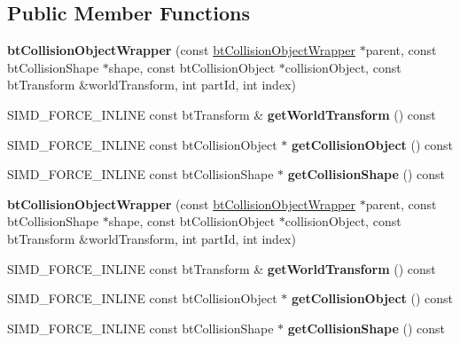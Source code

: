 \subsection*{Public Member Functions}
\begin{DoxyCompactItemize}
\item 
\mbox{\label{structbtCollisionObjectWrapper_a91f52c9f9a7499214302f1bb8a7a0766}} 
{\bfseries bt\+Collision\+Object\+Wrapper} (const \hyperlink{structbtCollisionObjectWrapper}{bt\+Collision\+Object\+Wrapper} $\ast$parent, const bt\+Collision\+Shape $\ast$shape, const bt\+Collision\+Object $\ast$collision\+Object, const bt\+Transform \&world\+Transform, int part\+Id, int index)
\item 
\mbox{\label{structbtCollisionObjectWrapper_a4280aa132597c941935204ce73485879}} 
S\+I\+M\+D\+\_\+\+F\+O\+R\+C\+E\+\_\+\+I\+N\+L\+I\+NE const bt\+Transform \& {\bfseries get\+World\+Transform} () const
\item 
\mbox{\label{structbtCollisionObjectWrapper_a94a2884cf3b29d74019a329f3cc89bc4}} 
S\+I\+M\+D\+\_\+\+F\+O\+R\+C\+E\+\_\+\+I\+N\+L\+I\+NE const bt\+Collision\+Object $\ast$ {\bfseries get\+Collision\+Object} () const
\item 
\mbox{\label{structbtCollisionObjectWrapper_a146ee81e912f887e8cb434d5cc1ed532}} 
S\+I\+M\+D\+\_\+\+F\+O\+R\+C\+E\+\_\+\+I\+N\+L\+I\+NE const bt\+Collision\+Shape $\ast$ {\bfseries get\+Collision\+Shape} () const
\item 
\mbox{\label{structbtCollisionObjectWrapper_a91f52c9f9a7499214302f1bb8a7a0766}} 
{\bfseries bt\+Collision\+Object\+Wrapper} (const \hyperlink{structbtCollisionObjectWrapper}{bt\+Collision\+Object\+Wrapper} $\ast$parent, const bt\+Collision\+Shape $\ast$shape, const bt\+Collision\+Object $\ast$collision\+Object, const bt\+Transform \&world\+Transform, int part\+Id, int index)
\item 
\mbox{\label{structbtCollisionObjectWrapper_a4280aa132597c941935204ce73485879}} 
S\+I\+M\+D\+\_\+\+F\+O\+R\+C\+E\+\_\+\+I\+N\+L\+I\+NE const bt\+Transform \& {\bfseries get\+World\+Transform} () const
\item 
\mbox{\label{structbtCollisionObjectWrapper_a94a2884cf3b29d74019a329f3cc89bc4}} 
S\+I\+M\+D\+\_\+\+F\+O\+R\+C\+E\+\_\+\+I\+N\+L\+I\+NE const bt\+Collision\+Object $\ast$ {\bfseries get\+Collision\+Object} () const
\item 
\mbox{\label{structbtCollisionObjectWrapper_a146ee81e912f887e8cb434d5cc1ed532}} 
S\+I\+M\+D\+\_\+\+F\+O\+R\+C\+E\+\_\+\+I\+N\+L\+I\+NE const bt\+Collision\+Shape $\ast$ {\bfseries get\+Collision\+Shape} () const
\end{DoxyCompactItemize}
